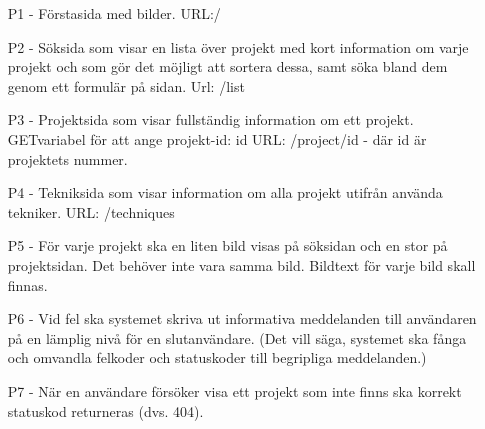 \documentclass{TDP003mall}
\begin{document}
\begin{enumerate}
\item[P1 - ] Förstasida med bilder. URL:/
\item[P2 - ] Söksida som visar en lista över projekt med kort information om varje projekt och som gör det möjligt att sortera dessa, samt söka bland dem genom ett formulär på sidan. Url: /list
\item[P3 - ] Projektsida som visar fullständig information om ett projekt. GETvariabel för att ange projekt-id: id URL: /project/id - där id är projektets nummer.
\item[P4 - ] Tekniksida som visar information om alla projekt utifrån använda tekniker. URL: /techniques
\item[P5 - ] För varje projekt ska en liten bild visas på söksidan och en stor på projektsidan. Det behöver inte vara samma bild. Bildtext för varje bild skall finnas.
\item[P6 - ] Vid fel ska systemet skriva ut informativa meddelanden till användaren på en lämplig nivå för en slutanvändare. (Det vill säga, systemet ska fånga och omvandla felkoder och statuskoder till begripliga meddelanden.)
\item[P7 - ] När en användare försöker visa ett projekt som inte finns ska korrekt statuskod returneras (dvs. 404).
\end{enumerate}
\end{document}
